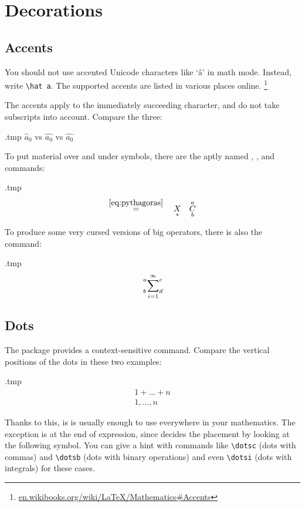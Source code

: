 %
%
%
\section{Decorations}

\subsection{Accents}

You should not use accented Unicode characters like `â' in math mode.
Instead, write \verb|\hat a|.
The supported accents are listed in various places online.%
\footnote{\url{en.wikibooks.org/wiki/LaTeX/Mathematics\#Accents}}

\begin{gotcha}
The accents apply to the immediately succeeding character,
and do not take subscripts into account.
Compare the three:
%
\begin{VerbatimOut}{\jobname.tmp}
$\hat a_0$ vs $\hat {a_0}$
vs $\widehat {a_0}$
\end{VerbatimOut}
\ShowExample
\end{gotcha}

To put material over and under symbols,
there are the aptly named , , and  commands:
%
\begin{VerbatimOut}{\jobname.tmp}
\[
\overset{\eqref{eq:pythagoras}}{=}
\quad \underset{\ast}{X}
\quad \overunderset{a}{b}{C}
\]
\end{VerbatimOut}
\ShowExample
%
To produce some very cursed versions of big operators,
there is also the  command:
%
\begin{VerbatimOut}{\jobname.tmp}
\[
\sideset{^a_b}{^c_d}\sum_{i=1}^\infty
\]
\end{VerbatimOut}
\ShowExample



%
%
\subsection{Dots}

The  package provides a context-sensitive  command.
Compare the vertical positions of the dots in these two examples:
%
\begin{VerbatimOut}{\jobname.tmp}
\begin{gather*}
1 + \dots + n\\
1, \dots, n
\end{gather*}
\end{VerbatimOut}
\ShowExample
%
Thanks to this, is is usually enough to use  everywhere in your mathematics.
The exception is at the end of expression,
since  decides the placement by looking at the following symbol.
You can give a hint with commands like \verb|\dotsc| (dots with commas)
and \verb|\dotsb| (dots with binary operations)
and even \verb|\dotsi| (dots with integrals) for these cases.

